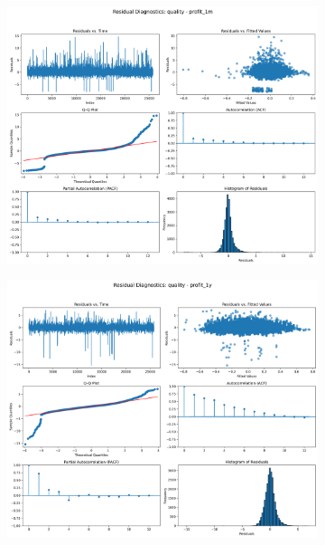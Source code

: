 \documentclass[11pt,english,a4paper,hidelinks]{book}
\begin{document}
\begin{figure}[H]
    \centering
    \begin{subfigure}[b]{0.32\textwidth}
        \centering
        \includegraphics[width=\textwidth]{images/code/models/linear_regression/first_model/AS/quality_profit_1m_residuals - Gaussian.png}
    \end{subfigure}
    \hfill
    \begin{subfigure}[b]{0.32\textwidth}
        \centering
        \includegraphics[width=\textwidth]{images/code/models/linear_regression/first_model/AS/quality_profit_1y_residuals - Gaussian.png}

\end{subfigure}
\end{figure}
\end{document}
